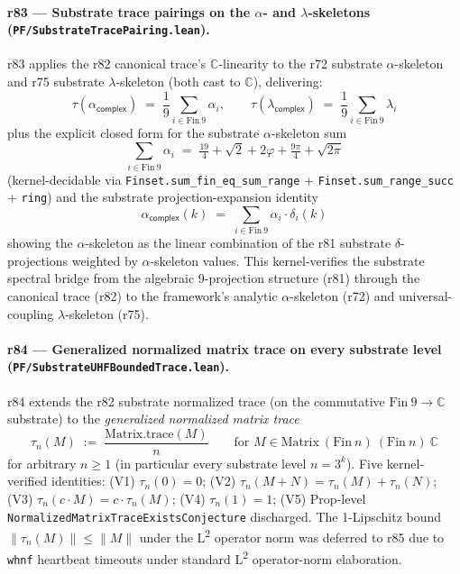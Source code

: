 \documentclass[11pt,a4paper]{amsart}
\theoremstyle{plain}
\theoremstyle{definition}
\begin{document}
\paragraph{r83 --- Substrate trace pairings on the $\alpha$- and $\lambda$-skeletons (\texttt{PF/SubstrateTracePairing.lean}).} r83 applies the r82 canonical trace's $\mathbb{C}$-linearity to the r72 substrate $\alpha$-skeleton and r75 substrate $\lambda$-skeleton (both cast to $\mathbb{C}$), delivering:
\[
\tau(\alpha_{\textsf{complex}}) \;=\; \frac{1}{9} \sum_{i \in \mathrm{Fin}~9} \alpha_i, \qquad \tau(\lambda_{\textsf{complex}}) \;=\; \frac{1}{9} \sum_{i \in \mathrm{Fin}~9} \lambda_i
\]
plus the explicit closed form for the substrate $\alpha$-skeleton sum
\[
\sum_{i \in \mathrm{Fin}~9} \alpha_i \;=\; \tfrac{19}{4} + \sqrt{2} + 2\varphi + \tfrac{9\pi}{4} + \sqrt{2\pi}
\]
(kernel-decidable via \texttt{Finset.sum\_fin\_eq\_sum\_range} + \texttt{Finset.sum\_range\_succ} + \texttt{ring}) and the substrate projection-expansion identity
\[
\alpha_{\textsf{complex}}(k) \;=\; \sum_{i \in \mathrm{Fin}~9} \alpha_i \cdot \delta_i(k)
\]
showing the $\alpha$-skeleton as the linear combination of the r81 substrate $\delta$-projections weighted by $\alpha$-skeleton values. This kernel-verifies the substrate spectral bridge from the algebraic 9-projection structure (r81) through the canonical trace (r82) to the framework's analytic $\alpha$-skeleton (r72) and universal-coupling $\lambda$-skeleton (r75).

\paragraph{r84 --- Generalized normalized matrix trace on every substrate level (\texttt{PF/SubstrateUHFBoundedTrace.lean}).} r84 extends the r82 substrate normalized trace (on the commutative $\mathrm{Fin}~9 \to \mathbb{C}$ substrate) to the \emph{generalized normalized matrix trace}
\[
\tau_n(M) \;:=\; \frac{\mathrm{Matrix.trace}(M)}{n} \qquad \text{for } M \in \mathrm{Matrix}~(\mathrm{Fin}~n)~(\mathrm{Fin}~n)~\mathbb{C}
\]
for arbitrary $n \ge 1$ (in particular every substrate level $n = 3^k$). Five kernel-verified identities: (V1) $\tau_n(0) = 0$; (V2) $\tau_n(M + N) = \tau_n(M) + \tau_n(N)$; (V3) $\tau_n(c \cdot M) = c \cdot \tau_n(M)$; (V4) $\tau_n(1) = 1$; (V5) Prop-level \texttt{NormalizedMatrixTraceExistsConjecture} discharged. The 1-Lipschitz bound $\|\tau_n(M)\| \le \|M\|$ under the L\textsuperscript{2} operator norm was deferred to r85 due to \texttt{whnf} heartbeat timeouts under standard L\textsuperscript{2} operator-norm elaboration.
\end{document}

